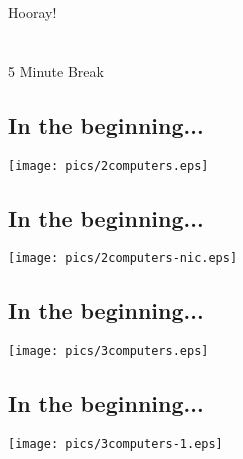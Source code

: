 \documentclass[xga]{xdvislides}
\begin{document}
\newpage
\vspace*{\fill}
\begin{center}
    \Hugesize
        Hooray! \\ [1em]
    \hspace*{5mm}
    \blueline\\
    \hspace*{5mm}\\
        5 Minute Break
\end{center}
\vspace*{\fill}


\subsection{In the beginning...}
\vspace*{\fill}
\begin{center}
	\texttt{[image: pics/2computers.eps]} \\
\end{center}
\vspace*{\fill}

\subsection{In the beginning...}
\vspace*{\fill}
\begin{center}
	\texttt{[image: pics/2computers-nic.eps]} \\
\end{center}
\vspace*{\fill}

\subsection{In the beginning...}
\vspace*{\fill}
\begin{center}
	\texttt{[image: pics/3computers.eps]} \\
\end{center}
\vspace*{\fill}

\subsection{In the beginning...}
\vspace*{\fill}
\begin{center}
	\texttt{[image: pics/3computers-1.eps]} \\
\end{center}
\vspace*{\fill}
\end{document}
